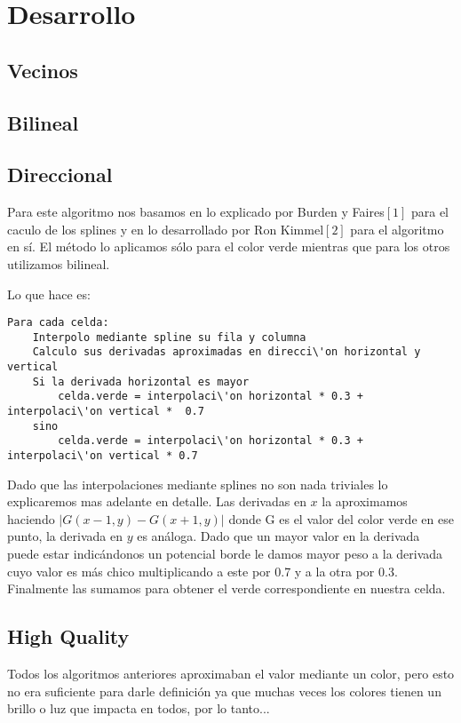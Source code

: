\section{Desarrollo}

\subsection{Vecinos}

\subsection{Bilineal}

\subsection{Direccional}

Para este algoritmo nos basamos en lo explicado por Burden y Faires$[1]$ para el caculo de los splines y en lo desarrollado por Ron Kimmel$[2]$ para el algoritmo en sí. El método lo aplicamos sólo para el color verde mientras que para los otros utilizamos bilineal. 

Lo que hace es:
\begin{lstlisting}[frame=single] 
Para cada celda:
	Interpolo mediante spline su fila y columna
	Calculo sus derivadas aproximadas en direcci\'on horizontal y vertical
	Si la derivada horizontal es mayor
		celda.verde = interpolaci\'on horizontal * 0.3 +  interpolaci\'on vertical *  0.7
	sino
		celda.verde = interpolaci\'on horizontal * 0.3 +  interpolaci\'on vertical * 0.7	
\end{lstlisting}

Dado que las interpolaciones mediante splines no son nada triviales lo explicaremos mas adelante en detalle. Las derivadas en $x$  la aproximamos haciendo $|G(x-1,y)-G(x+1,y)|$ donde G es el valor del color verde en ese punto, la derivada en $y$ es análoga. Dado que un mayor valor en la derivada puede estar indicándonos un potencial borde le damos mayor peso a la derivada cuyo valor es más chico multiplicando a este por 0.7 y a la otra por 0.3. Finalmente las sumamos para obtener el verde correspondiente en nuestra celda.

\subsection{High Quality}

Todos los algoritmos anteriores aproximaban el valor mediante un color, pero esto no era suficiente para darle definición ya que muchas veces los colores tienen un brillo o luz que impacta en todos, por lo tanto... 

